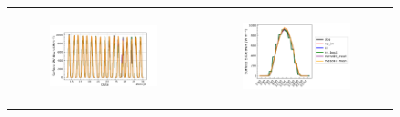 \begin{figure}[hbtp]
\begin{tabular}{cc}
        \begin{subfigure}[t]{0.5\textwidth}
            \caption{}
            \includegraphics[width=\textwidth]{images/chap5/SOP_TS_DC/time_series_elsplans_SWdnSFC.png}
        \end{subfigure} &
        \begin{subfigure}[t]{0.5\textwidth}
            \caption{}
            \includegraphics[width=\textwidth]{images/chap5/SOP_TS_DC/diurnal_cycle_elsplans_SWdnSFC.png}
        \end{subfigure} \\
        

\end{tabular}
\end{figure}
